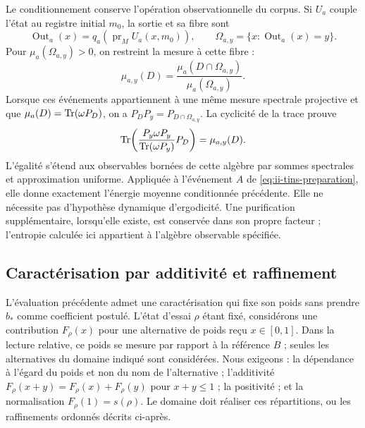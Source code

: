 Le conditionnement conserve l’opération observationnelle du corpus. Si
$U_a$ couple l’état au registre initial $m_0$, la sortie et sa fibre sont
\[
 \operatorname{Out}_a(x)=q_a(\operatorname{pr}_M U_a(x,m_0)),\qquad
 \Omega_{a,y}=\{x:\operatorname{Out}_a(x)=y\}.
\]
Pour $\mu_a(\Omega_{a,y})>0$, on restreint la mesure à cette fibre :
\begin{equation}
 \mu_{a,y}(D)=\frac{\mu_a(D\cap\Omega_{a,y})}{\mu_a(\Omega_{a,y})}.
 \label{eq:ii-tins-fiber}
\end{equation}
Lorsque ces événements appartiennent à une même mesure spectrale projective et que
$\mu_a(D)=\operatorname{Tr}(\omega P_D)$, on a
$P_DP_y=P_{D\cap\Omega_{a,y}}$. La cyclicité de la trace prouve
\[
 \operatorname{Tr}\!\left(\frac{P_y\omega P_y}{\operatorname{Tr}(\omega P_y)}P_D\right)
 =\mu_{a,y}(D).
\]
L’égalité s’étend aux observables bornées de cette algèbre par sommes
spectrales et approximation uniforme. Appliquée à l’événement $A$ de
\eqref{eq:ii-tins-preparation}, elle donne exactement l’énergie moyenne
conditionnée précédente. Elle ne nécessite pas d’hypothèse dynamique d’ergodicité.
Une purification supplémentaire, lorsqu’elle existe, est conservée dans son propre facteur ;
l’entropie calculée ici appartient à l’algèbre observable spécifiée.

\subsection{Caractérisation par additivité et raffinement}
\label{subsec:ii-tins-aditividad}

L’évaluation précédente admet une caractérisation qui fixe son poids sans
prendre $b_*$ comme coefficient postulé. L’état d’essai $\rho$ étant fixé,
considérons une contribution $F_\rho(x)$ pour une alternative de poids
reçu $x\in[0,1]$. Dans la lecture relative, ce poids se mesure par rapport à
la référence $B$ ; seules les alternatives du domaine indiqué sont considérées.
Nous exigeons : la dépendance à l’égard du poids et non du nom de l’alternative ; l’additivité
$F_\rho(x+y)=F_\rho(x)+F_\rho(y)$ pour $x+y\le1$ ; la positivité ; et la
normalisation $F_\rho(1)=s(\rho)$. Le domaine doit réaliser ces répartitions,
ou les raffinements ordonnés décrits ci-après.

